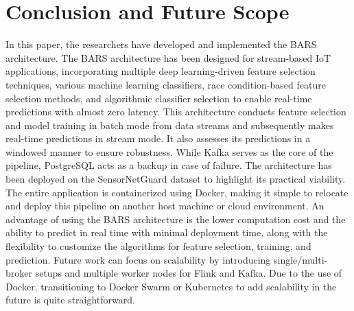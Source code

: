 \documentclass[runningheads]{llncs}
\begin{document}
\section{Conclusion and Future Scope}
\label{sec:Conclusion-and-FutureScope}
In this paper, the researchers have developed and implemented the BARS architecture. The BARS architecture has been designed for stream-based IoT applications, incorporating multiple deep learning-driven feature selection techniques, various machine learning classifiers, race condition-based feature selection methods, and algorithmic classifier selection to enable real-time predictions with almost zero latency. This architecture conducts feature selection and model training in batch mode from data streams and subsequently makes real-time predictions in stream mode. It also assesses its predictions in a windowed manner to ensure robustness. While Kafka serves as the core of the pipeline, PostgreSQL acts as a backup in case of failure. The architecture has been deployed on the SensorNetGuard dataset to highlight its practical viability. The entire application is containerized using Docker, making it simple to relocate and deploy this pipeline on another host machine or cloud environment. An advantage of using the BARS architecture is the lower computation cost and the ability to predict in real time with minimal deployment time, along with the flexibility to customize the algorithms for feature selection, training, and prediction. Future work can focus on scalability by introducing single/multi-broker setups and multiple worker nodes for Flink and Kafka. Due to the use of Docker, transitioning to Docker Swarm or Kubernetes to add scalability in the future is quite straightforward.


\end{document}
